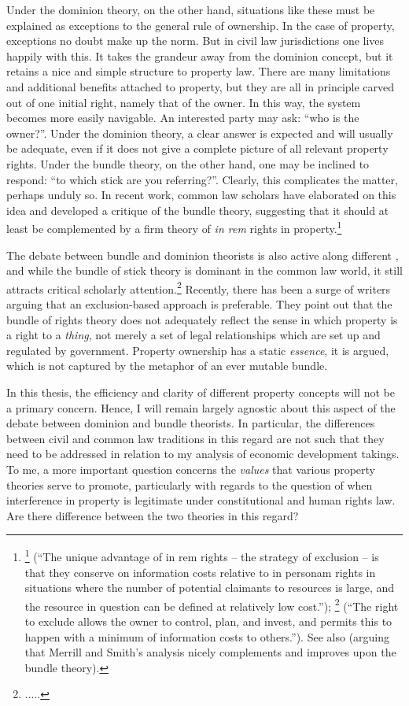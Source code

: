 Under the dominion theory, on the other hand, situations like these must be explained as exceptions to the general rule of ownership. In the case of property, exceptions no doubt make up the norm. But in civil law jurisdictions one lives happily with this. It takes the grandeur away from the dominion concept, but it retains a nice and simple structure to property law. There are many limitations and additional benefits attached to property, but they are all in principle carved out of one initial right, namely that of the owner. In this way, the system becomes more easily navigable. An interested party may ask: ``who is the owner?''. Under the dominion theory, a clear answer is expected and will usually be adequate, even if it does not give a complete picture of all relevant property rights. Under the bundle theory, on the other hand, one may be inclined to respond: ``to which stick are you referring?''. Clearly, this complicates the matter, perhaps unduly so. In recent work, common law scholars have elaborated on this idea and developed a critique of the bundle theory, suggesting that it should at least be complemented by a firm theory of {\it in rem} rights in property.\footnote{\footcite[793]{merrill01b} (``The unique advantage of in rem rights -- the strategy of exclusion -- is that they conserve on information costs relative to in personam rights in situations where the number of potential claimants to resources is large, and the resource in question can be defined at relatively low cost.''); \footcite[389]{merrill01} (``The right to exclude allows the owner to control, plan, and invest, and permits this to happen with a minimum of information costs to others.''). See also \cite{ellickson11} (arguing that Merrill and Smith's analysis nicely complements and improves upon the bundle theory).}

The debate between bundle and dominion theorists is also active along different , and while the bundle of stick theory is dominant in the common law world, it still attracts critical scholarly attention.\footnote{.....} Recently, there has been a surge of writers arguing that an exclusion-based approach is preferable. They point out that the bundle of rights theory does not adequately reflect the sense in which property is a right to a {\it thing}, not merely a set of legal relationships which are set up and regulated by government. Property ownership has a static {\it essence}, it is argued, which is not captured by the metaphor of an ever mutable bundle.

In this thesis, the efficiency and clarity of different property concepts will not be a primary concern. Hence, I will remain largely agnostic about this aspect of the debate between dominion and bundle theorists. In particular, the differences between civil and common law traditions in this regard are not such that they need to be addressed in relation to my analysis of economic development takings. To me, a more important question concerns the {\it values} that various property theories serve to promote, particularly with regards to the question of when interference in property is legitimate under constitutional and human rights law. Are there difference between the two theories in this regard? 

